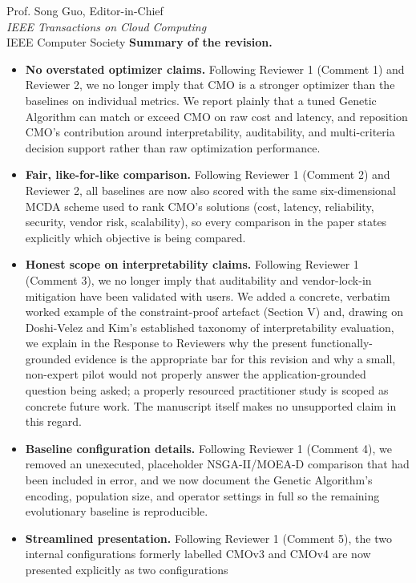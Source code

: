 \documentclass[12pt,a4paper]{letter}
\begin{document}
\begin{letter}{
  Prof. Song Guo, Editor-in-Chief \\
  \textit{IEEE Transactions on Cloud Computing} \\
  IEEE Computer Society
}
\bigskip
\textbf{Summary of the revision.}
\begin{itemize}
  \item \textbf{No overstated optimizer claims.} Following Reviewer 1
        (Comment 1) and Reviewer 2, we no longer imply that CMO is a
        stronger optimizer than the baselines on individual metrics. We
        report plainly that a tuned Genetic Algorithm can match or exceed
        CMO on raw cost and latency, and reposition CMO's contribution
        around interpretability, auditability, and multi-criteria decision
        support rather than raw optimization performance.
  \item \textbf{Fair, like-for-like comparison.} Following Reviewer 1
        (Comment 2) and Reviewer 2, all baselines are now also scored with
        the same six-dimensional MCDA scheme used to rank CMO's solutions
        (cost, latency, reliability, security, vendor risk, scalability),
        so every comparison in the paper states explicitly which objective
        is being compared.
  \item \textbf{Honest scope on interpretability claims.} Following
        Reviewer 1 (Comment 3), we no longer imply that auditability and
        vendor-lock-in mitigation have been validated with users. We added
        a concrete, verbatim worked example of the constraint-proof
        artefact (Section V) and, drawing on Doshi-Velez and Kim's
        established taxonomy of interpretability evaluation, we explain in
        the Response to Reviewers why the present functionally-grounded
        evidence is the appropriate bar for this revision and why a small,
        non-expert pilot would not properly answer the application-grounded
        question being asked; a properly resourced practitioner study is
        scoped as concrete future work. The manuscript itself makes no
        unsupported claim in this regard.
  \item \textbf{Baseline configuration details.} Following Reviewer 1
        (Comment 4), we removed an unexecuted, placeholder NSGA-II/MOEA-D
        comparison that had been included in error, and we now document
        the Genetic Algorithm's encoding, population size, and operator
        settings in full so the remaining evolutionary baseline is
        reproducible.
  \item \textbf{Streamlined presentation.} Following Reviewer 1
        (Comment 5), the two internal configurations formerly labelled
        CMOv3 and CMOv4 are now presented explicitly as two configurations

\end{itemize}
\end{letter}
\end{document}
